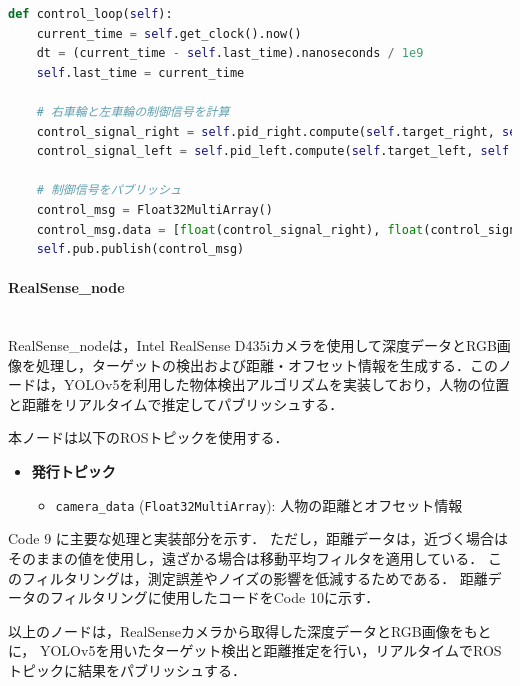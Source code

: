 \begin{lstlisting}[language=Python, caption=制御ループ (PID\_node.py)]
def control_loop(self):
    current_time = self.get_clock().now()
    dt = (current_time - self.last_time).nanoseconds / 1e9
    self.last_time = current_time

    # 右車輪と左車輪の制御信号を計算
    control_signal_right = self.pid_right.compute(self.target_right, self.current_right, dt)
    control_signal_left = self.pid_left.compute(self.target_left, self.current_left, dt)

    # 制御信号をパブリッシュ
    control_msg = Float32MultiArray()
    control_msg.data = [float(control_signal_right), float(control_signal_left)]
    self.pub.publish(control_msg)
\end{lstlisting}
\newpage


\paragraph{RealSense\_node}\mbox{}\\
RealSense\_nodeは，Intel RealSense D435iカメラを使用して深度データとRGB画像を処理し，ターゲットの検出および距離・オフセット情報を生成する．このノードは，YOLOv5を利用した物体検出アルゴリズムを実装しており，人物の位置と距離をリアルタイムで推定してパブリッシュする．

本ノードは以下のROSトピックを使用する．
\begin{itemize}
    \item \textbf{発行トピック}
          \begin{itemize}
              \item \texttt{camera\_data} (\texttt{Float32MultiArray}): 人物の距離とオフセット情報
          \end{itemize}
\end{itemize}

Code 9 に主要な処理と実装部分を示す．
ただし，距離データは，近づく場合はそのままの値を使用し，遠ざかる場合は移動平均フィルタを適用している．
このフィルタリングは，測定誤差やノイズの影響を低減するためである．
距離データのフィルタリングに使用したコードをCode 10に示す．

以上のノードは，RealSenseカメラから取得した深度データとRGB画像をもとに，
YOLOv5を用いたターゲット検出と距離推定を行い，リアルタイムでROSトピックに結果をパブリッシュする．

